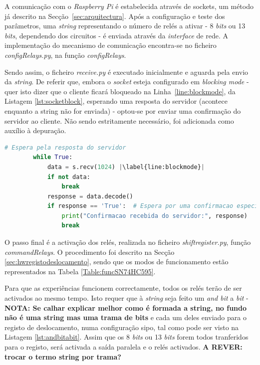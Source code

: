 A comunicação com o \textit{Raspberry Pi} é estabelecida através de sockets, um método já descrito na Secção~\ref{sec:arquitectura}. Após a configuração e teste dos parâmetros, uma \textit{string} representando o número de relés a ativar - 8 \textit{bits} ou 13 \textit{bits}, dependendo dos circuitos - é enviada através da \textit{interface} de rede. A implementação do mecanismo de comunicação encontra-se no ficheiro \textit{configRelays.py}, na função \textit{config\textunderscore Relays}.

Sendo assim, o ficheiro \textit{receive.py} é executado inicialmente e aguarda pela envio da \textit{string}. De referir que, embora o \textit{socket} esteja configurado em \textit{blocking mode} - quer isto dizer que o cliente ficará bloqueado na Linha~\ref{line:blockmode}, da Listagem \ref{lst:socketblock}, esperando uma resposta do servidor \cite{Sockets} (acontece enquanto a string não for enviada) - optou-se por enviar uma confirmação do servidor ao cliente. Não sendo estritamente necessário, foi adicionada como auxílio à depuração.

\begin{minipage}{0.9\linewidth}
	\begin{lstlisting}[language=Python,escapechar=|, caption=\textit{Block Mode \textins{Sockets} configRelays.py}, label=lst:socketblock]
		# Espera pela resposta do servidor
        while True:
            data = s.recv(1024) |\label{line:blockmode}|
            if not data:
                break
            response = data.decode()
            if response == 'True':  # Espera por uma confirmacao especifica do servidor
                print("Confirmacao recebida do servidor:", response)
                break
	\end{lstlisting}
\end{minipage}

O passo final é a activação dos relés, realizada no ficheiro \textit{shift\textunderscore register.py}, função \textit{commandRelays}. O procedimento foi descrito na Secção \ref{sec:hwregistodeslocamento}, sendo que os modos de funcionamento estão representados na Tabela \ref{Table:funcSN74HC595}.

Para que as experiências funcionem correctamente, todos os relés terão de ser activados ao mesmo tempo. Isto requer que à \textit{string} seja feito um \textit{and bit} a \textit{bit} - \textbf{NOTA: Se calhar explicar melhor como é formada a string, no fundo não é uma string mas uma trama de bits} e cada um deles enviado para o registo de deslocamento, numa configuração \acrshort{sipo}, tal como pode ser visto na Listagem \ref{lst:andbitabit}. Assim que os 8 \textit{bits} ou 13 \textit{bits} forem todos tranferidos para o registo, será activada a saída paralela e o relés activados. \textbf{A REVER: trocar o termo string por trama?} 

